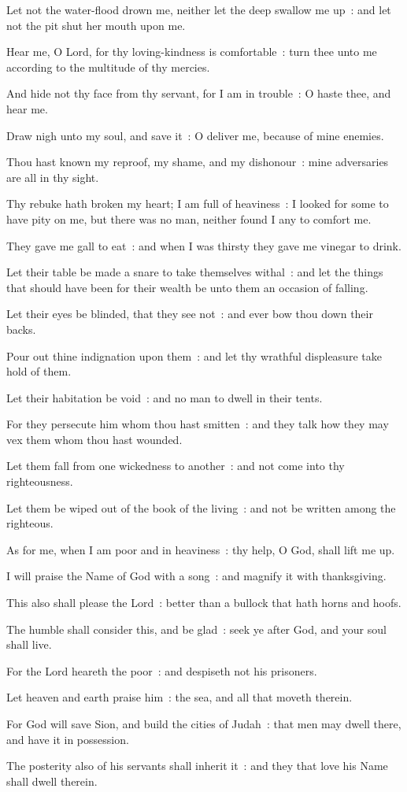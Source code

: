 Let not the water-flood drown me, neither let the deep swallow me up~: and let not the pit shut her mouth upon me.\par
{}Hear me, O Lord, for thy loving-kindness is comfortable~: turn thee unto me according to the multitude of thy mercies.\par
{}And hide not thy face from thy servant, for I am in trouble~: O haste thee, and hear me.\par
{}Draw nigh unto my soul, and save it~: O deliver me, because of mine enemies.\par
{}Thou hast known my reproof, my shame, and my dishonour~: mine adversaries are all in thy sight.\par
{}Thy rebuke hath broken my heart; I am full of heaviness~: I looked for some to have pity on me, but there was no man, neither found I any to comfort me.\par
{}They gave me gall to eat~: and when I was thirsty they gave me vinegar to drink.\par
{}Let their table be made a snare to take themselves withal~: and let the things that should have been for their wealth be unto them an occasion of falling.\par
{}Let their eyes be blinded, that they see not~: and ever bow thou down their backs.\par
{}Pour out thine indignation upon them~: and let thy wrathful displeasure take hold of them.\par
{}Let their habitation be void~: and no man to dwell in their tents.\par
{}For they persecute him whom thou hast smitten~: and they talk how they may vex them whom thou hast wounded.\par
{}Let them fall from one wickedness to another~: and not come into thy righteousness.\par
{}Let them be wiped out of the book of the living~: and not be written among the righteous.\par
{}As for me, when I am poor and in heaviness~: thy help, O God, shall lift me up.\par
{}I will praise the Name of God with a song~: and magnify it with thanksgiving.\par
{}This also shall please the Lord~: better than a bullock that hath horns and hoofs.\par
{}The humble shall consider this, and be glad~: seek ye after God, and your soul shall live.\par
{}For the Lord heareth the poor~: and despiseth not his prisoners.\par
{}Let heaven and earth praise him~: the sea, and all that moveth therein.\par
{}For God will save Sion, and build the cities of Judah~: that men may dwell there, and have it in possession.\par
{}The posterity also of his servants shall inherit it~: and they that love his Name shall dwell therein.\par

